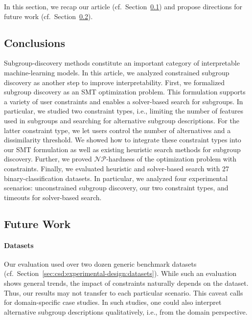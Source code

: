 \documentclass{article}
\theoremstyle{definition}
\begin{document}
In this section, we recap our article (cf.~Section~\ref{sec:csd:conclusion:conclusion}) and propose directions for future work (cf.~Section~\ref{sec:csd:conclusion:future-work}).

\subsection{Conclusions}
\label{sec:csd:conclusion:conclusion}

Subgroup-discovery methods constitute an important category of interpretable machine-learning models.
In this article, we analyzed constrained subgroup discovery as another step to improve interpretability.
First, we formalized subgroup discovery as an SMT optimization problem.
This formulation supports a variety of user constraints and enables a solver-based search for subgroups.
In particular, we studied two constraint types, i.e., limiting the number of features used in subgroups and searching for alternative subgroup descriptions.
For the latter constraint type, we let users control the number of alternatives and a dissimilarity threshold.
We showed how to integrate these constraint types into our SMT formulation as well as existing heuristic search methods for subgroup discovery.
Further, we proved $\mathcal{NP}$-hardness of the optimization problem with constraints.
Finally, we evaluated heuristic and solver-based search with 27 binary-classification datasets.
In particular, we analyzed four experimental scenarios:
unconstrained subgroup discovery, our two constraint types, and timeouts for solver-based search.

\subsection{Future Work}
\label{sec:csd:conclusion:future-work}

\paragraph{Datasets}

Our evaluation used over two dozen generic benchmark datasets (cf.~Section~\ref{sec:csd:experimental-design:datasets}).
While such an evaluation shows general trends, the impact of constraints naturally depends on the dataset.
Thus, our results may not transfer to each particular scenario.
This caveat calls for domain-specific case studies.
In such studies, one could also interpret alternative subgroup descriptions qualitatively, i.e., from the domain perspective.
\end{document}

